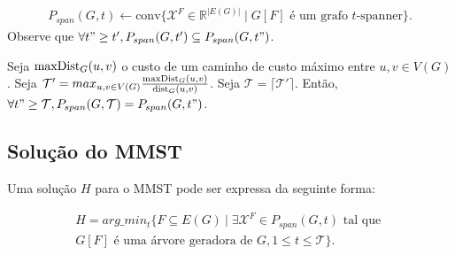 \documentclass[11pt,reqno]{amsart}
\newcommand{\dist}{{\rm dist}}
\newcommand{\maxdist}{{\rm maxDist}}
\newcommand{\incid}{\mathcal{X}}
\newcommand{\incidY}{\mathcal{Y}}
\newcommand{\maxstretchfactor}{\mathcal{T}}
\newcommand{\espacoX}{\mathbb{R}^{|E(G)|}}
\begin{document}
\begin{equation*}
\begin{split}
P_{span}(G,t) \leftarrow \text{conv}\{\incid^{F} \in \espacoX\; |\; \text{$G[F]$ é um grafo $t$-spanner\}}. 
\end{split}
\end{equation*}
Observe que $\forall t" \ge t', P_{span}(G,t') \subseteq P_{span}(G,t")$. 

Seja $\maxdist_G(u,v)$ o custo de um caminho de custo máximo entre $u,v \in V(G)$. 
Seja $\maxstretchfactor' = max_{u,v \in V(G)}\frac{\maxdist_G(u,v)}{\dist_G(u,v)}$. 
Seja $\maxstretchfactor = \lceil \maxstretchfactor' \rceil$.
Então, $\forall t" \ge \maxstretchfactor, P_{span}(G,\maxstretchfactor) = P_{span}(G,t")$.



\subsection{Solução do MMST}
\label{sec:poliedro_sol_mmst}

Uma solução $H$ para o MMST pode ser expressa da seguinte forma: 

\begin{equation*}
\begin{split}
H = arg\_min_{t}\{F \subseteq E(G)\ |\; \exists \incid^{F} \in P_{span}(G,t)\text{ tal que }\\
G[F]\text{ é uma árvore geradora de }G, 1 \le t \le \maxstretchfactor\}.
\end{split}
\end{equation*}
\end{document}
